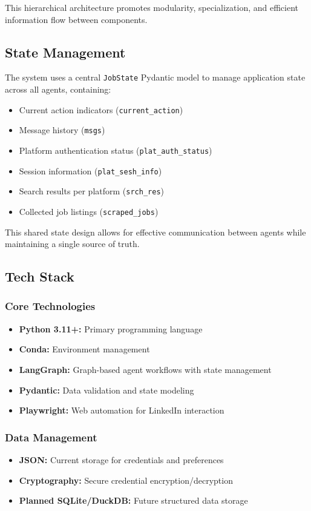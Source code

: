 \documentclass[a4paper,12pt]{article}
\begin{document}
This hierarchical architecture promotes modularity, specialization, and efficient information flow between components.

\subsection{State Management}
The system uses a central \texttt{JobState} Pydantic model to manage application state across all agents, containing:

\begin{itemize}
    \item Current action indicators (\texttt{current\_action})
    \item Message history (\texttt{msgs})
    \item Platform authentication status (\texttt{plat\_auth\_status})
    \item Session information (\texttt{plat\_sesh\_info})
    \item Search results per platform (\texttt{srch\_res})
    \item Collected job listings (\texttt{scraped\_jobs})
\end{itemize}

This shared state design allows for effective communication between agents while maintaining a single source of truth.

\subsection{Tech Stack}
\label{subsec:techstack}

\subsubsection{Core Technologies}
\begin{itemize}
    \item \textbf{Python 3.11+:} Primary programming language
    \item \textbf{Conda:} Environment management
    \item \textbf{LangGraph:} Graph-based agent workflows with state management
    \item \textbf{Pydantic:} Data validation and state modeling
    \item \textbf{Playwright:} Web automation for LinkedIn interaction
\end{itemize}

\subsubsection{Data Management}
\begin{itemize}
    \item \textbf{JSON:} Current storage for credentials and preferences
    \item \textbf{Cryptography:} Secure credential encryption/decryption
    \item \textbf{Planned SQLite/DuckDB:} Future structured data storage
\end{itemize}
\end{document}
